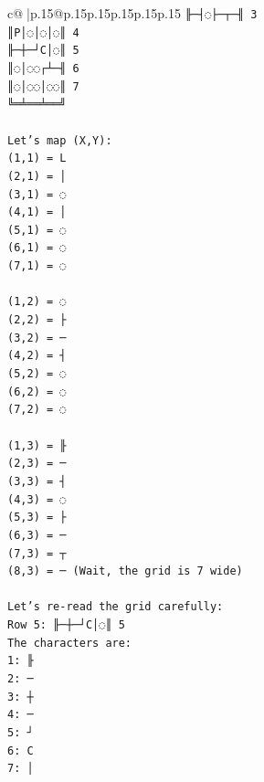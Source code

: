 \documentclass{article}
\begin{document}
{\begin{supertabular}{c@{$\;$}|p{.15\linewidth}@{}p{.15\linewidth}p{.15\linewidth}p{.15\linewidth}p{.15\linewidth}p{.15\linewidth}}
{{{\texttt{╟─┤◌├─┬─╢ 3} \\
\texttt{║P│◌│◌│◌║ 4} \\
\texttt{╟─┼─┘C│◌║ 5} \\
\texttt{║◌│◌◌┌┴─╢ 6} \\
\texttt{║◌│◌◌│◌◌║ 7} \\
\texttt{╚═╧══╧══╝} \\
\\ 
\texttt{Let's map (X,Y):} \\
\texttt{(1,1) = L} \\
\texttt{(2,1) = │} \\
\texttt{(3,1) = ◌} \\
\texttt{(4,1) = │} \\
\texttt{(5,1) = ◌} \\
\texttt{(6,1) = ◌} \\
\texttt{(7,1) = ◌} \\
\\ 
\texttt{(1,2) = ◌} \\
\texttt{(2,2) = ├} \\
\texttt{(3,2) = ─} \\
\texttt{(4,2) = ┤} \\
\texttt{(5,2) = ◌} \\
\texttt{(6,2) = ◌} \\
\texttt{(7,2) = ◌} \\
\\ 
\texttt{(1,3) = ╟} \\
\texttt{(2,3) = ─} \\
\texttt{(3,3) = ┤} \\
\texttt{(4,3) = ◌} \\
\texttt{(5,3) = ├} \\
\texttt{(6,3) = ─} \\
\texttt{(7,3) = ┬} \\
\texttt{(8,3) = ─ (Wait, the grid is 7 wide)} \\
\\ 
\texttt{Let's re{-}read the grid carefully:} \\
\texttt{Row 5: ╟─┼─┘C│◌║ 5} \\
\texttt{The characters are:} \\
\texttt{1: ╟} \\
\texttt{2: ─} \\
\texttt{3: ┼} \\
\texttt{4: ─} \\
\texttt{5: ┘} \\
\texttt{6: C} \\
\texttt{7: │} \\
}}}
\end{supertabular}}
\end{document}
